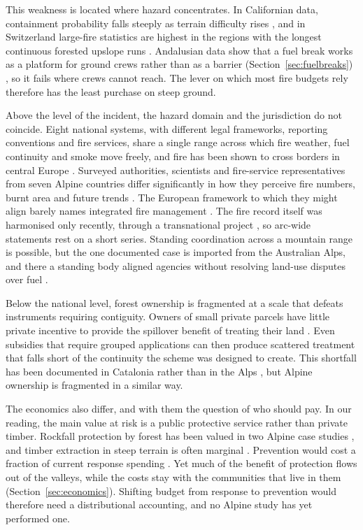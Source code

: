 \documentclass[11pt,a4paper]{article}
\begin{document}
This weakness is located where hazard concentrates. In Californian data, containment probability falls steeply as terrain difficulty rises \citep{cardil_assessing_2025}, and in Switzerland large-fire statistics are highest in the regions with the longest continuous forested upslope runs \citep{conedera_linking_2024}. Andalusian data show that a fuel break works as a platform for ground crews rather than as a barrier (Section~\ref{sec:fuelbreaks}) \citep{ortega_modeling_2024}, so it fails where crews cannot reach. The lever on which most fire budgets rely therefore has the least purchase on steep ground.

Above the level of the incident, the hazard domain and the jurisdiction do not coincide. Eight national systems, with different legal frameworks, reporting conventions and fire services, share a single range across which fire weather, fuel continuity and smoke move freely, and fire has been shown to cross borders in central Europe \citep{avouris_exposure_2025}. Surveyed authorities, scientists and fire-service representatives from seven Alpine countries differ significantly in how they perceive fire numbers, burnt area and future trends \citep{hoang_stakeholders_2026}. The European framework to which they might align barely names integrated fire management \citep{plana_framing_2024}. The fire record itself was harmonised only recently, through a transnational project \citep{valese_wildfires_2011}, so arc-wide statements rest on a short series. Standing coordination across a mountain range is possible, but the one documented case is imported from the Australian Alps, and there a standing body aligned agencies without resolving land-use disputes over fuel \citep{lockwood_biodiversity_2014}.

Below the national level, forest ownership is fragmented at a scale that defeats instruments requiring contiguity. Owners of small private parcels have little private incentive to provide the spillover benefit of treating their land \citep{bayham_economics_2022}. Even subsidies that require grouped applications can then produce scattered treatment that falls short of the continuity the scheme was designed to create. This shortfall has been documented in Catalonia rather than in the Alps \citep{gorrizmifsud_current_2026}, but Alpine ownership is fragmented in a similar way.

The economics also differ, and with them the question of who should pay. In our reading, the main value at risk is a public protective service rather than private timber. Rockfall protection by forest has been valued in two Alpine case studies \citep{accastello_asforesee_2019, moos_climate_2021}, and timber extraction in steep terrain is often marginal \citep{dinca_timber_2025}. Prevention would cost a fraction of current response spending \citep{muller_forest_2020}. Yet much of the benefit of protection flows out of the valleys, while the costs stay with the communities that live in them (Section~\ref{sec:economics}). Shifting budget from response to prevention would therefore need a distributional accounting, and no Alpine study has yet performed one.
\end{document}
